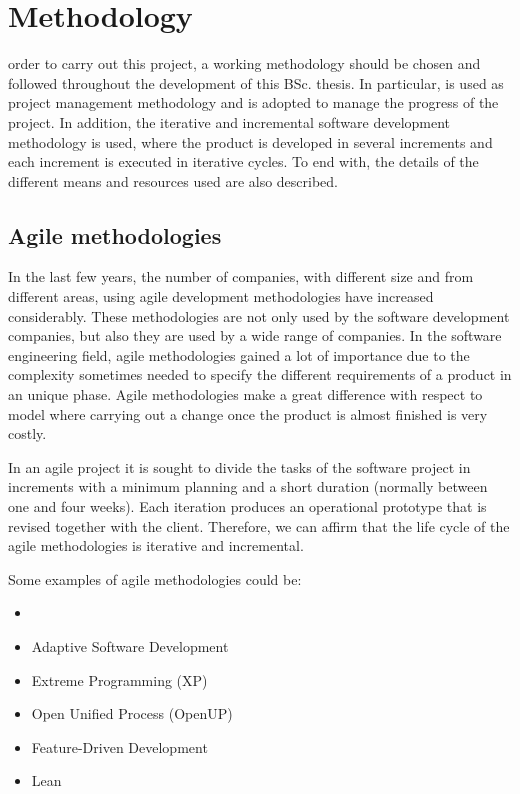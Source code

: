 
\chapter{Methodology}
\label{chap:methodology}

 order to carry out this project, a working methodology should be chosen and followed throughout the development of this \ac{BSc.} thesis. In particular,  is used as project management methodology and  is adopted to manage the progress of the project. In addition, the iterative and incremental software development methodology is used, where the product is developed in several increments and each increment is executed in iterative cycles. To end with, the details of the different means and resources used are also described.


\section{Agile methodologies}
In the last few years, the number of companies, with different size and from different areas, using agile development methodologies have increased considerably. These methodologies are not only used by the software development companies, but also they are used by a wide range of companies. In the software engineering field, agile methodologies gained a lot of importance due to the complexity sometimes needed to specify the different requirements of a product in an unique phase. Agile methodologies make a great difference with respect to  model where carrying out a change once the product is almost finished is very costly.

In an agile project it is sought to divide the tasks of the software project in increments with a minimum planning and a short duration (normally between one and four weeks). Each iteration produces an operational prototype that is revised together with the client. Therefore, we can affirm that the life cycle of the agile methodologies is iterative and incremental.

Some examples of agile methodologies could be:
\begin{multicols}{2}
	\begin{itemize}
		\item {} \cite{ScrumGuide}
		\item Adaptive Software Development \\ \cite{ASD}
		\item Extreme Programming (XP) \cite{XPProgramming}
		\item Open Unified Process (OpenUP) \\ \cite{Bal07}
		\item Feature-Driven Development \cite{FDD}
		\item Lean \cite{PP03}
	\end{itemize}
\end{multicols}


